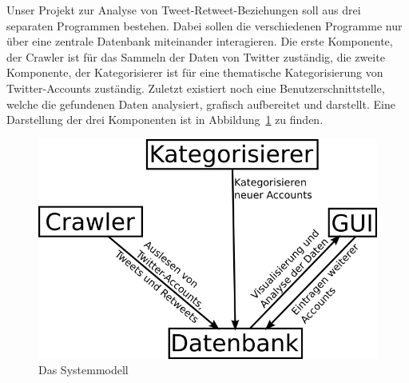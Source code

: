 Unser Projekt zur Analyse von Tweet-Retweet-Beziehungen soll aus drei separaten Programmen bestehen. Dabei sollen die verschiedenen Programme nur über eine zentrale Datenbank miteinander interagieren. Die erste Komponente, der Crawler ist für das Sammeln der Daten von Twitter zuständig, die zweite Komponente, der Kategorisierer ist für eine thematische Kategorisierung von Twitter-Accounts zuständig. Zuletzt existiert noch eine Benutzerschnittstelle, welche die gefundenen Daten analysiert, grafisch aufbereitet und darstellt. Eine Darstellung der drei Komponenten ist in Abbildung~\ref{c:systemmodell} zu finden.

\begin{figure}[h]
	\centering
	\includegraphics[scale=2]{img/Systemmodell.png}
	\caption{Das Systemmodell}
	\label{c:systemmodell}
\end{figure}

